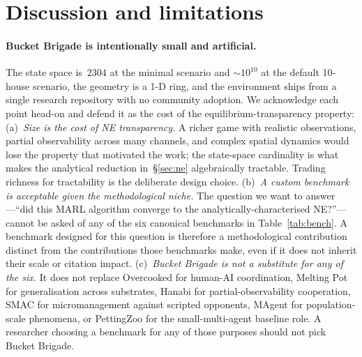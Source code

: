 \documentclass{anvil-paper}
\begin{document}
\section{Discussion and limitations}
\label{sec:discussion}

\paragraph{Bucket Brigade is intentionally small and artificial.}
The state space is~$2304$ at the minimal scenario and $\sim\!10^{10}$ at the
default 10-house scenario, the geometry is a 1-D ring, and the environment
ships from a single research repository with no community adoption. We
acknowledge each point head-on and defend it as the cost of the
equilibrium-transparency property:
(a)~\emph{Size is the cost of NE transparency.} A richer game with realistic
observations, partial observability across many channels, and complex spatial
dynamics would lose the property that motivated the work; the state-space
cardinality is what makes the analytical reduction in~\S\ref{sec:ne}
algebraically tractable. Trading richness for tractability is the deliberate
design choice.
(b)~\emph{A custom benchmark is acceptable given the methodological niche.}
The question we want to answer---``did this MARL algorithm converge to the
analytically-characterised NE?''---cannot be asked of any of the six
canonical benchmarks in Table~\ref{tab:bench}. A benchmark designed for this
question is therefore a methodological contribution distinct from the
contributions those benchmarks make, even if it does not inherit their scale
or citation impact.
(c)~\emph{Bucket Brigade is not a substitute for any of the six.} It does
not replace Overcooked for human-AI coordination, Melting Pot for
generalisation across substrates, Hanabi for partial-observability
cooperation, SMAC for micromanagement against scripted opponents, MAgent
for population-scale phenomena, or PettingZoo for the small-multi-agent
baseline role. A researcher choosing a benchmark for any of those purposes
should not pick Bucket Brigade.
\end{document}
